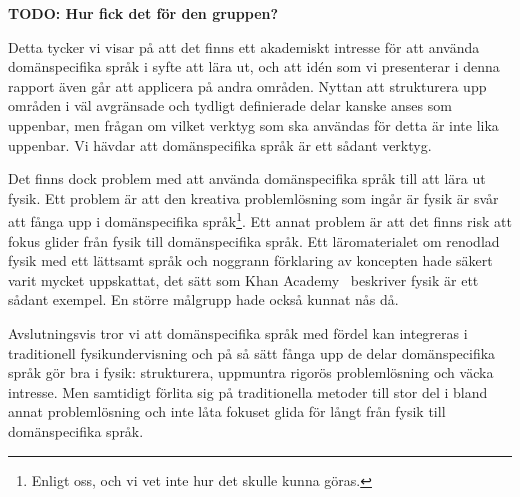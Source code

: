 \textbf{TODO: Hur fick det för den gruppen?}

Detta tycker vi visar på att det finns ett
akademiskt intresse för att använda domänspecifika språk i syfte att lära ut,
och att idén som vi presenterar i denna rapport även går att applicera på
andra områden. Nyttan att strukturera upp områden i väl avgränsade och
tydligt definierade delar kanske anses som uppenbar, men frågan om vilket
verktyg som ska användas för detta är inte lika uppenbar. Vi hävdar att
domänspecifika språk är ett sådant verktyg.

Det finns dock problem med att använda domänspecifika språk till att lära ut fysik. Ett problem är att den kreativa problemlösning som ingår är fysik är svår att fånga upp i domänspecifika språk\footnote{Enligt oss, och vi vet inte hur det skulle kunna göras.}. Ett annat problem är att det finns risk att fokus glider från fysik till domänspecifika språk. Ett läromaterialet om renodlad fysik med ett lättsamt språk och noggrann förklaring av koncepten hade säkert varit mycket uppskattat, det sätt som Khan Academy~\cite{khan} beskriver fysik är ett sådant exempel. En större målgrupp hade också kunnat nås då.

Avslutningsvis tror vi att domänspecifika språk med fördel kan integreras i traditionell fysikundervisning och på så sätt fånga upp de delar domänspecifika språk gör bra i fysik: strukturera, uppmuntra rigorös problemlösning och väcka intresse. Men samtidigt förlita sig på traditionella metoder till stor del i bland annat problemlösning och inte låta fokuset glida för långt från fysik till domänspecifika språk.




